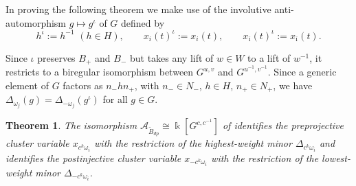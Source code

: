 \documentclass[12pt]{amsart}
\newcommand{\cA}{\mathcal{A}}
\newcommand{\kk}{\Bbbk}
\newcommand{\ol}[1]{\overline{#1}}
\newcommand{\Bdp}{\widetilde{B}_{dp}}
\newtheorem{theorem}{Theorem}[section]
\theoremstyle{remark}
\numberwithin{equation}{section}
\numberwithin{figure}{section}
\begin{document}
In proving the following theorem we make use of the involutive anti-automorphism $g \mapsto g^\iota$ of $G$ defined by
\begin{equation}
  h^\iota := h^{-1}\,\, (h\in H),
  \quad
  \quad
  x_i(t)^\iota := x_i(t),
  \quad
  \quad
  x_{\ol{\imath}}(t)^\iota := x_{\ol{\imath}}(t).
\end{equation}

Since $\iota$ preserves $B_+$ and $B_-$ but takes any lift of $w \in W$ to a lift of $w^{-1}$, it restricts to a biregular isomorphism between $G^{u,v}$ and $G^{u^{-1},v^{-1}}$.
Since a generic element of $G$ factors as $n_- h n_+$, with $n_- \in N_-$, $h \in H$, $n_+ \in N_+$, we have $\Delta_{\omega_j}(g) = \Delta_{-\omega_j}(g^\iota)$ for all $g \in G$.

\begin{theorem}\label{thm:mainirregular}
  The isomorphism $\cA_{\Bdp} \cong \kk[G^{c,c^{-1}}]$ of  identifies the preprojective cluster variable $x_{c^k\omega_i}$ with the restriction of the highest-weight minor $\Delta_{c^k\omega_i}$ and identifies the postinjective cluster variable $x_{-c^k \omega_i}$ with the restriction of the lowest-weight minor $\Delta_{-c^k \omega_i}$.
\end{theorem}
\end{document}
